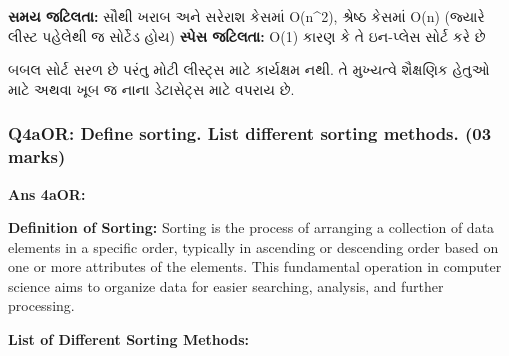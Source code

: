 \textbf{સમય જટિલતા:} સૌથી ખરાબ અને સરેરાશ કેસમાં O(n\^{}2), શ્રેષ્ઠ કેસમાં O(n)
(જ્યારે લીસ્ટ પહેલેથી જ સોર્ટેડ હોય) \textbf{સ્પેસ જટિલતા:} O(1) કારણ કે તે ઇન-પ્લેસ
સોર્ટ કરે છે

બબલ સોર્ટ સરળ છે પરંતુ મોટી લીસ્ટ્સ માટે કાર્યક્ષમ નથી. તે મુખ્યત્વે શૈક્ષણિક હેતુઓ માટે
અથવા ખૂબ જ નાના ડેટાસેટ્સ માટે વપરાય છે.

\hypertarget{q4aor-define-sorting.-list-different-sorting-methods.-03-marks}{%
\subsubsection{Q4aOR: Define sorting. List different sorting methods.
(03
marks)}\label{q4aor-define-sorting.-list-different-sorting-methods.-03-marks}}

\textbf{Ans 4aOR:}

\textbf{Definition of Sorting:} Sorting is the process of arranging a
collection of data elements in a specific order, typically in ascending
or descending order based on one or more attributes of the elements.
This fundamental operation in computer science aims to organize data for
easier searching, analysis, and further processing.

\textbf{List of Different Sorting Methods:}

